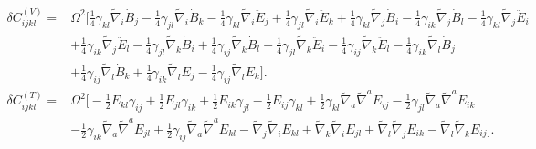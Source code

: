\documentclass[10pt,letterpaper]{article}
\begin{document}
\begin{align}
\delta C_{ijkl}^{(V)}={}&\Omega^2\bigg[\tfrac{1}{4} \gamma_{kl} \tilde{\nabla}_{i}\dot{B}_{j}
 -  \tfrac{1}{4} \gamma_{jl} \tilde{\nabla}_{i}\dot{B}_{k}
 -  \tfrac{1}{4} \gamma_{kl} \tilde{\nabla}_{i}\ddot{E}_{j}
 + \tfrac{1}{4} \gamma_{jl} \tilde{\nabla}_{i}\ddot{E}_{k}
 + \tfrac{1}{4} \gamma_{kl} \tilde{\nabla}_{j}\dot{B}_{i}
 -  \tfrac{1}{4} \gamma_{ik} \tilde{\nabla}_{j}\dot{B}_{l}
 -  \tfrac{1}{4} \gamma_{kl} \tilde{\nabla}_{j}\ddot{E}_{i}\nonumber\\
& + \tfrac{1}{4} \gamma_{ik} \tilde{\nabla}_{j}\ddot{E}_{l}
 -  \tfrac{1}{4} \gamma_{jl} \tilde{\nabla}_{k}\dot{B}_{i}
 + \tfrac{1}{4} \gamma_{ij} \tilde{\nabla}_{k}\dot{B}_{l}
 + \tfrac{1}{4} \gamma_{jl} \tilde{\nabla}_{k}\ddot{E}_{i}
 -  \tfrac{1}{4} \gamma_{ij} \tilde{\nabla}_{k}\ddot{E}_{l}
 -  \tfrac{1}{4} \gamma_{ik} \tilde{\nabla}_{l}\dot{B}_{j}\nonumber\\
& + \tfrac{1}{4} \gamma_{ij} \tilde{\nabla}_{l}\dot{B}_{k}
 + \tfrac{1}{4} \gamma_{ik} \tilde{\nabla}_{l}\ddot{E}_{j}
 -  \tfrac{1}{4} \gamma_{ij} \tilde{\nabla}_{l}\ddot{E}_{k}\bigg].
\end{align}
\begin{align}
\delta C_{ijkl}^{(T)}={}&\Omega^2\bigg[- \tfrac{1}{2} \ddot{E}_{kl} \gamma_{ij}
 + \tfrac{1}{2} \ddot{E}_{jl} \gamma_{ik}
 + \tfrac{1}{2} \ddot{E}_{ik} \gamma_{jl}
 -  \tfrac{1}{2} \ddot{E}_{ij} \gamma_{kl}
 + \tfrac{1}{2} \gamma_{kl} \tilde{\nabla}_{a}\tilde{\nabla}^{a}E_{ij}
 -  \tfrac{1}{2} \gamma_{jl} \tilde{\nabla}_{a}\tilde{\nabla}^{a}E_{ik}\nonumber\\
& -  \tfrac{1}{2} \gamma_{ik} \tilde{\nabla}_{a}\tilde{\nabla}^{a}E_{jl}
 + \tfrac{1}{2} \gamma_{ij} \tilde{\nabla}_{a}\tilde{\nabla}^{a}E_{kl}
 -  \tilde{\nabla}_{j}\tilde{\nabla}_{i}E_{kl}
 + \tilde{\nabla}_{k}\tilde{\nabla}_{i}E_{jl}
 + \tilde{\nabla}_{l}\tilde{\nabla}_{j}E_{ik}
 -  \tilde{\nabla}_{l}\tilde{\nabla}_{k}E_{ij}\bigg].
\end{align}
\end{document}
